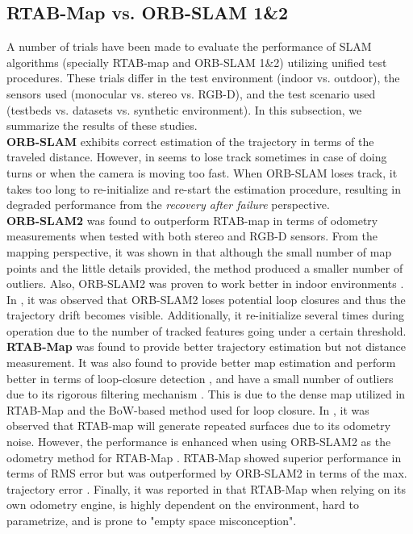 \documentclass[12pt]{article}
\begin{document}
\subsection{RTAB-Map vs. ORB-SLAM 1\&2}
A number of trials have been made to evaluate the performance of SLAM algorithms (specially RTAB-map and ORB-SLAM 1\&2)  utilizing unified test procedures. These trials differ in the test environment (indoor vs. outdoor), the sensors used (monocular vs. stereo vs. RGB-D), and the test scenario used (testbeds vs. datasets vs. synthetic environment). In this subsection, we summarize the results of these studies. \\
\indent\textbf{ORB-SLAM} exhibits correct estimation of the trajectory in terms of the traveled distance. However, in seems to lose track sometimes in case of doing turns \cite{study2018} or when the camera is moving too fast. When ORB-SLAM loses track, it takes too long to re-initialize and re-start \cite{8806213} the estimation procedure, resulting in degraded performance from the \textit{recovery after failure} perspective.\\
\indent\textbf{ORB-SLAM2} was found to outperform RTAB-map in terms of odometry measurements \cite{8806213} when tested with both stereo and RGB-D sensors. From the mapping perspective, it was shown in \cite{8710464} that although the small number of map points and the little details provided, the method produced a smaller number of outliers. Also, ORB-SLAM2 was proven to work better in indoor environments \cite{8806213}\cite{8710464}. In \cite{8215331}, it was observed that ORB-SLAM2 loses potential loop closures and thus the trajectory drift becomes visible. Additionally, it re-initialize several times during operation due to the number of tracked features going under a certain threshold. \\
\indent\textbf{RTAB-Map} was found to provide better trajectory estimation but not distance measurement. It was also found to provide better map estimation and perform better in terms of loop-closure detection \cite{8806213}, and have a small number of outliers due to its rigorous filtering mechanism \cite{8250081}. This is due to the dense map utilized in RTAB-Map and the BoW-based method used for loop closure. In \cite{8250081}, it was observed that RTAB-map will generate repeated surfaces due to its odometry noise. However, the performance is enhanced when using ORB-SLAM2 as the odometry method for RTAB-Map \cite{labbe2019rtab}. RTAB-Map showed superior performance in terms of RMS error but was outperformed by ORB-SLAM2 in terms of the max. trajectory error \cite{8710464}. Finally, it was reported in \cite{study2018} that RTAB-Map when relying on its own odometry engine, is highly dependent on the environment, hard to parametrize, and is prone to "empty space misconception".  
\end{document}
